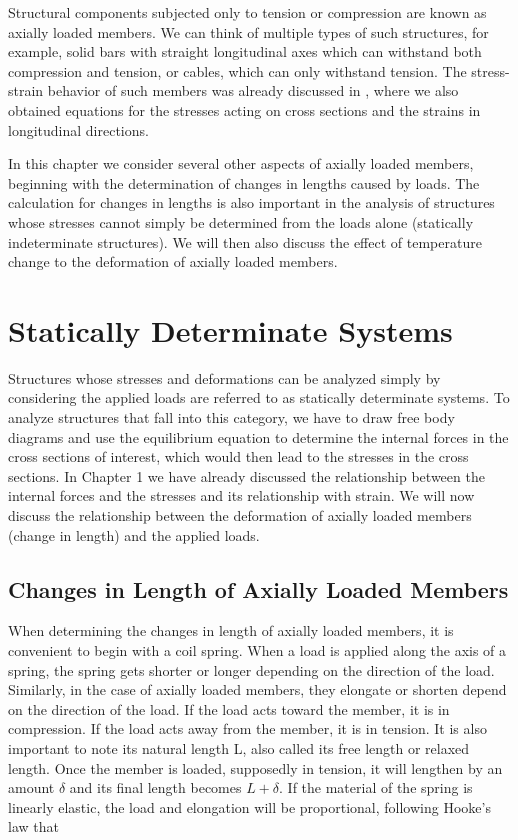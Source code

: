 \documentclass[
10pt,
a4paper,
openany,
svgnames,
]{kaobook} %
\begin{document}
Structural components subjected only to tension or compression are known as axially loaded members. We can think of multiple types of such structures, for example, solid bars with straight longitudinal axes which can withstand both compression and tension, or cables, which can only withstand tension. The stress-strain behavior of such members was already discussed in , where we also obtained equations for the stresses acting on cross sections and the strains in longitudinal directions.

In this chapter we consider several other aspects of axially loaded members, beginning with the determination of changes in lengths caused by loads. The calculation for changes in lengths is also important in the analysis of structures whose stresses cannot simply be determined from the loads alone (statically indeterminate structures). We will then also discuss the effect of temperature change to the deformation of axially loaded members.


\section{Statically Determinate Systems}

Structures whose stresses and deformations can be analyzed simply by considering the applied loads are referred to as statically determinate systems. To analyze structures that fall into this category, we have to draw free body diagrams and use the equilibrium equation to determine the internal forces in the cross sections of interest, which would then lead to the stresses in the cross sections. In Chapter 1 we have already discussed the relationship between the internal forces and the stresses and its relationship with strain. We will now discuss the relationship between the deformation of axially loaded members (change in length) and the applied loads.

\subsection{Changes in Length of Axially Loaded Members}

When determining the changes in length of axially loaded members, it is convenient to begin with a coil spring. When a load is applied along the axis of a spring, the spring gets shorter or longer depending on the direction of the load.
Similarly, in the case of axially loaded members, they elongate or shorten depend on the direction of the load. If the load acts toward the member, it is in compression. If the load acts away from the member, it is in tension. It is also important to note its natural length L, also called its free length or relaxed length. Once the member is loaded, supposedly in tension, it will lengthen by an amount $\delta$ and its final length becomes $L + \delta$. If the material of the spring is linearly elastic, the load and elongation will be proportional, following Hooke’s law that
\end{document}

